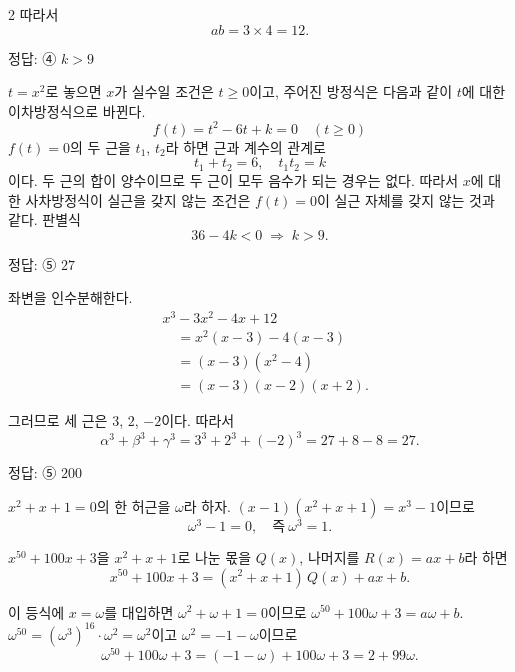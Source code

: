\documentclass[10pt]{article}
\begin{document}
\begin{multicols}{2}
따라서
\[ ab = 3 \times 4 = 12. \]

\begin{answerbox}정답: ④ $k > 9$\end{answerbox}

$t = x^2$로 놓으면 $x$가 실수일 조건은 $t \ge 0$이고, 주어진 방정식은 다음과 같이 $t$에 대한 이차방정식으로 바뀐다.
\[ f(t) = t^2 - 6t + k = 0 \quad(t \ge 0) \]
$f(t) = 0$의 두 근을 $t_1$, $t_2$라 하면 근과 계수의 관계로
\[ t_1 + t_2 = 6,\quad t_1 t_2 = k \]
이다. 두 근의 합이 양수이므로 두 근이 모두 음수가 되는 경우는 없다. 따라서 $x$에 대한 사차방정식이 실근을 갖지 않는 조건은 $f(t) = 0$이 실근 자체를 갖지 않는 것과 같다. 판별식
\[ 36 - 4k < 0 \;\Rightarrow\; k > 9. \]

\begin{answerbox}정답: ⑤ $27$\end{answerbox}

좌변을 인수분해한다.
\begin{align*}
&x^3 - 3x^2 - 4x + 12 \\
&\quad = x^2(x - 3) - 4(x - 3) \\
&\quad = (x - 3)(x^2 - 4) \\
&\quad = (x - 3)(x - 2)(x + 2).
\end{align*}

그러므로 세 근은 $3$, $2$, $-2$이다. 따라서
\[ \alpha^3 + \beta^3 + \gamma^3 = 3^3 + 2^3 + (-2)^3 = 27 + 8 - 8 = 27. \]

\begin{answerbox}정답: ⑤ $200$\end{answerbox}

$x^2 + x + 1 = 0$의 한 허근을 $\omega$라 하자. $(x - 1)(x^2 + x + 1) = x^3 - 1$이므로
\[ \omega^3 - 1 = 0,\quad \text{즉}\ \omega^3 = 1. \]

$x^{50} + 100x + 3$을 $x^2 + x + 1$로 나눈 몫을 $Q(x)$, 나머지를 $R(x) = ax + b$라 하면
\[ x^{50} + 100x + 3 = (x^2 + x + 1)\,Q(x) + ax + b. \]

이 등식에 $x = \omega$를 대입하면 $\omega^2 + \omega + 1 = 0$이므로 $\omega^{50} + 100\omega + 3 = a\omega + b$. $\omega^{50} = (\omega^3)^{16} \cdot \omega^2 = \omega^2$이고 $\omega^2 = -1 - \omega$이므로
\[ \omega^{50} + 100\omega + 3 = (-1 - \omega) + 100\omega + 3 = 2 + 99\omega. \]


\end{multicols}
\end{document}
